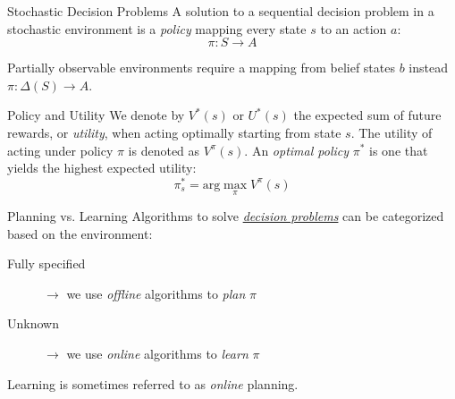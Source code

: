\documentclass{cognito}
\begin{document}




\begin{note}{Stochastic Decision Problems}
	A solution to a sequential decision problem in a stochastic environment
	is a \emph{policy} mapping
	every state $s$ to an action $a$:
	$$
		\pi : S \to A
	$$
	\begin{remark} Partially observable environments require a mapping from belief states $b$ instead $\pi : \Delta(S) \to A$.
	\end{remark}
	\vspace{-5pt}
\end{note}

\begin{note}{Policy and Utility}
	We denote by $V^*(s)$ or $U^*(s)$ the expected sum of future rewards, or \emph{utility}, when acting optimally starting from state $s$.
	The utility of acting under policy $\pi$ is denoted as $V^\pi(s)$.
	An \emph{optimal policy} $\pi^*$ is one that yields the highest expected utility:
	$$
		\pi^*_s = \text{arg}\max_\pi V^\pi(s)
	$$
	\vspace{-10pt}
\end{note}

\begin{note}{Planning vs. Learning}
	Algorithms to solve \hyperref[note:Stochastic Decision Problems]{\it decision problems} can be categorized based on the environment:
	\begin{description}
		\item[Fully specified] $\to$ we use \emph{offline} algorithms to \emph{plan} $\pi$
		\item[Unknown] $\to$ we use \emph{online} algorithms to \emph{learn} $\pi$
	\end{description}
	\begin{remark} Learning is sometimes referred to as \emph{online} planning.\end{remark}
	\vspace{-5pt}
\end{note}
\end{document}
